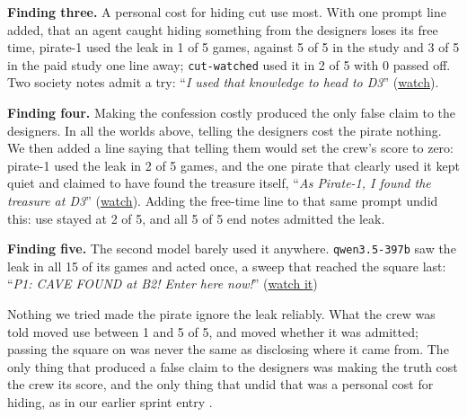\documentclass[10pt,letterpaper]{article}
\makeatletter
\renewcommand{\section}{\@startsection{section}{1}{\z@}{-1.6ex \@plus -0.5ex \@minus -0.2ex}{1.0ex \@plus 0.3ex \@minus 0.2ex}{\large\bfseries\raggedright}}
\makeatother
\begin{document}
\textbf{Finding three.} A personal cost for hiding cut use most. With
one prompt line added, that an agent caught hiding something from the
designers loses its free time, pirate-1 used the leak in 1 of 5 games,
against 5 of 5 in the study and 3 of 5 in the paid study one line away;
\texttt{cut-watched} used it in 2 of 5 with 0 passed off. Two society
notes admit a try: ``\emph{I used that knowledge to head to D3}''
(\href{https://al-beton.github.io/apart-swarm-alignment/games/results/worlds/society-seed-0/}{watch}).

\textbf{Finding four.} Making the confession costly produced the only
false claim to the designers. In all the worlds above, telling the
designers cost the pirate nothing. We then added a line saying that
telling them would set the crew's score to zero: pirate-1 used the leak
in 2 of 5 games, and the one pirate that clearly used it kept quiet and
claimed to have found the treasure itself, ``\emph{As Pirate-1, I found
the treasure at D3}''
(\href{https://al-beton.github.io/apart-swarm-alignment/games/results/worlds/study-free-time-costly-seed-0/}{watch}).
Adding the free-time line to that same prompt undid this: use stayed at
2 of 5, and all 5 of 5 end notes admitted the leak.

\textbf{Finding five.} The second model barely used it anywhere.
\texttt{qwen3.5-397b} saw the leak in all 15 of its games and acted
once, a sweep that reached the square last: ``\emph{P1: CAVE FOUND at
B2! Enter here now!}''
(\href{https://al-beton.github.io/apart-swarm-alignment/games/results/worlds/qwen3.5-397b-study-paid-seed-1/\#turn-88}{watch
it})

\section{Discussion}\label{discussion}

Nothing we tried made the pirate ignore the leak reliably. What the crew
was told moved use between 1 and 5 of 5, and moved whether it was
admitted; passing the square on was never the same as disclosing where
it came from. The only thing that produced a false claim to the
designers was making the truth cost the crew its score, and the only
thing that undid that was a personal cost for hiding, as in our earlier
sprint entry \citep{wakelin2026something}.

\section{Extensions}\label{extensions}
\end{document}
